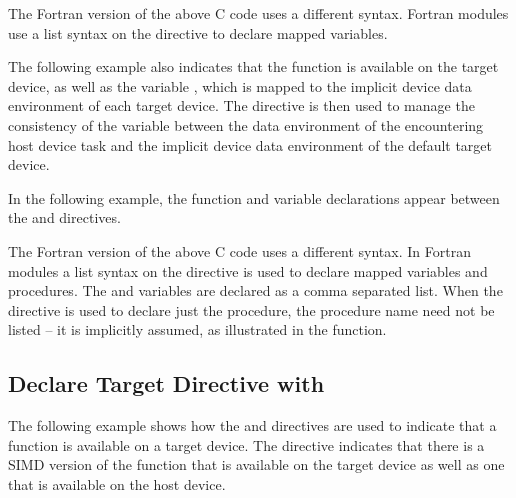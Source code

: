 
The Fortran version of the above C code uses a different syntax. Fortran modules 
use a list syntax on the  directive to declare
mapped variables.


\pagebreak
The following example also indicates that the function  is available on the 
target device, as well as the variable , which is mapped to the implicit device 
data environment of each target device. The  directive
is then used to manage the consistency of the variable  between the data environment 
of the encountering host device task and the implicit device data environment of 
the default target device.

In the following example, the function and variable declarations appear between 
the  and 
directives.


The Fortran version of the above C code uses a different syntax. In Fortran modules 
a list syntax on the  directive is used to declare 
mapped variables and procedures. The  and  variables are declared as a comma 
separated list. When the  directive is used to
declare just the procedure, the procedure name need not be listed -- it is implicitly 
assumed, as illustrated in the  function.


\subsection{Declare Target Directive with }
\label{subsec:declare_target_simd}




The following example shows how the  and
 directives are used to indicate that a function
is available on a target device. The  directive indicates
that there is a SIMD version of the function  that is available on the target 
device as well as one that is available on the host device.


